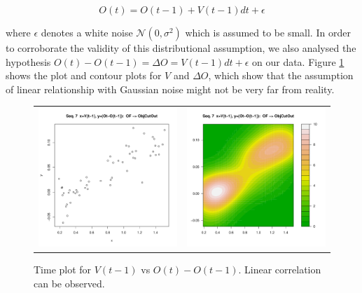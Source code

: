 \begin{equation}
O(t) =O(t-1) +V(t-1)dt +\epsilon
\end{equation}

where $\epsilon$ denotes a white noise $\mathcal{N}(0,\sigma^2)$ which is assumed to be small. In order to corroborate the validity of this distributional assumption, we also analysed the hypothesis $O(t) - O(t-1) = \Delta O = V(t-1)dt +\epsilon$ on our data. Figure \ref{Figure:daimlerVvsOffs} shows the plot and contour plots for $V$ and $\Delta O$, which show that the assumption of linear relationship with Gaussian noise might not be very far from reality.

\begin{figure}
  \centering
  \setlength{\tabcolsep}{0.05pt}
  \renewcommand{\arraystretch}{0.02}
    \begin{tabular}{cc}
    \includegraphics[width=60mm]{figures/DaimlerOBJplotSerie7.pdf}&
    \includegraphics[width=60mm]{figures/DaimlerOBJcontourSerie7.pdf}\\
  \end{tabular}
      \caption{ \label{Figure:daimlerVvsOffs}Time plot for $V(t-1)$ vs $O(t) - O(t-1)$. Linear correlation can be observed.}
\end{figure}


